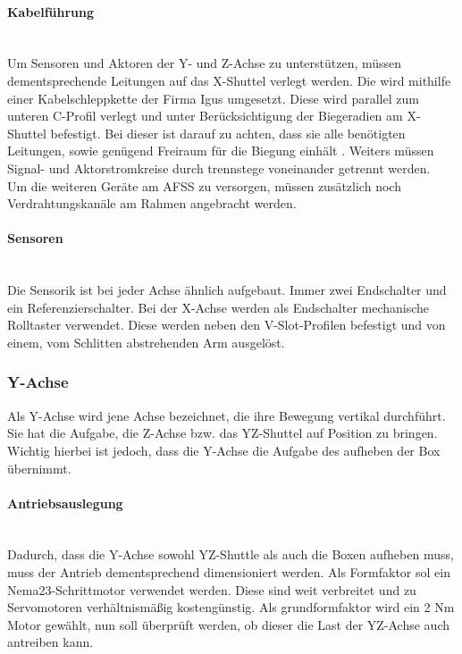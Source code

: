 \paragraph{Kabelführung} \mbox{}\\
Um Sensoren und Aktoren der Y- und Z-Achse zu unterstützen, müssen dementsprechende Leitungen auf das X-Shuttel verlegt werden. Die wird mithilfe einer Kabelschleppkette der Firma Igus umgesetzt. Diese wird parallel zum unteren C-Profil verlegt und unter Berücksichtigung der Biegeradien am X-Shuttel befestigt. Bei dieser ist darauf zu achten, dass sie alle benötigten Leitungen, sowie genügend Freiraum für die Biegung einhält \cite{igus_freitragend}. Weiters müssen Signal- und Aktorstromkreise durch trennstege voneinander getrennt werden.\\
Um die weiteren Geräte am AFSS zu versorgen, müssen zusätzlich noch Verdrahtungskanäle am Rahmen angebracht werden. 

\paragraph{Sensoren}\mbox{}\\
Die Sensorik ist bei jeder Achse ähnlich aufgebaut. Immer zwei Endschalter und ein Referenzierschalter. Bei der X-Achse werden als Endschalter mechanische Rolltaster verwendet. Diese werden neben den V-Slot-Profilen befestigt und von einem, vom Schlitten abstrehenden Arm ausgelöst. 

\subsubsection{Y-Achse}
Als Y-Achse wird jene Achse bezeichnet, die ihre Bewegung vertikal durchführt. Sie hat die Aufgabe, die Z-Achse bzw. das YZ-Shuttel auf Position zu bringen. Wichtig hierbei ist jedoch, dass die Y-Achse die Aufgabe des aufheben der Box übernimmt.

\paragraph{Antriebsauslegung}\mbox{}\\
Dadurch, dass die Y-Achse sowohl YZ-Shuttle als auch die Boxen aufheben muss, muss der Antrieb dementsprechend dimensioniert werden. Als Formfaktor sol ein Nema23-Schrittmotor verwendet werden. Diese sind weit verbreitet und zu Servomotoren verhältnismäßig kostengünstig. Als grundformfaktor wird ein 2 Nm Motor gewählt, nun soll überprüft werden, ob dieser die Last der YZ-Achse auch antreiben kann.

